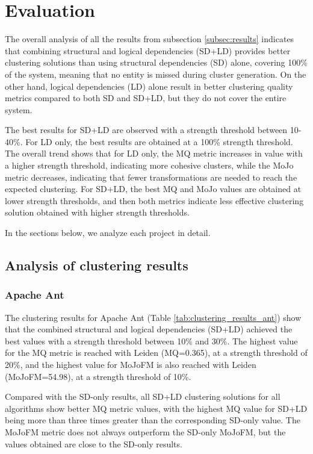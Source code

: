 \documentclass{ieeeaccess}
\begin{document}
\section{Evaluation}
\label{sec:evaluation}

The overall analysis of all the results from subsection \ref{subsec:results} indicates that combining structural and logical dependencies (SD+LD) provides better clustering solutions than using structural dependencies (SD) alone, covering 100\% of the system, meaning that no entity is missed during cluster generation. On the other hand, logical dependencies (LD) alone result in better clustering quality metrics compared to both SD and SD+LD, but they do not cover the entire system.

The best results for SD+LD are observed with a strength threshold between 10-40\%. For LD only, the best results are obtained at a 100\% strength threshold. The overall trend shows that for LD only, the MQ metric increases in value with a higher strength threshold, indicating more cohesive clusters, while the MoJo metric decreases, indicating that fewer transformations are needed to reach the expected clustering. For SD+LD, the best MQ and MoJo values are obtained at lower strength thresholds, and then both metrics indicate less effective clustering solution obtained with higher strength thresholds.

In the sections below, we analyze each project in detail.

\subsection{Analysis of clustering results}

\subsubsection{Apache Ant}

The clustering results for Apache Ant (Table \ref{tab:clustering_results_ant}) show that the combined structural and logical dependencies (SD+LD) achieved the best values with a strength threshold between 10\% and 30\%. The highest value for the MQ metric is reached with Leiden (MQ=0.365), at a strength threshold of 20\%, and the highest value for MoJoFM is also reached with Leiden (MoJoFM=54.98), at a strength threshold of 10\%.

Compared with the SD-only results, all SD+LD clustering solutions for all algorithms show better MQ metric values, with the highest MQ value for SD+LD being more than three times greater than the corresponding SD-only value. The MoJoFM metric does not always outperform the SD-only MoJoFM, but the values obtained are close to the SD-only results.
\end{document}
